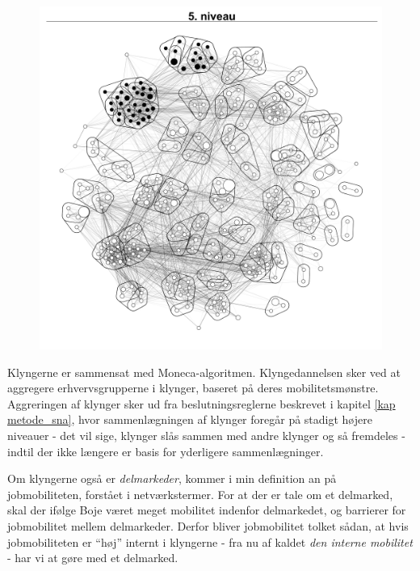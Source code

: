 
\begin{figure}[H]
\begin{centering}
  \includegraphics[width=10 cm]{fig/netvaerkskort/kort_seg_proces5.pdf}
  \caption{}
  \label{fig_seg_proces5}
\end{centering}
\end{figure}

Klyngerne er sammensat med Moneca-algoritmen. Klyngedannelsen sker ved at aggregere erhvervsgrupperne i klynger, baseret på deres mobilitetsmønstre. Aggreringen af klynger sker ud fra beslutningsreglerne beskrevet i kapitel \ref{kap metode_sna}, hvor sammenlægningen af klynger foregår på stadigt højere niveauer - det vil sige, klynger slås sammen med andre klynger og så fremdeles - indtil der ikke længere er basis for yderligere sammenlægninger. 


Om klyngerne også er \emph{delmarkeder}, kommer i min definition an på jobmobiliteten, forstået i netværkstermer. For at der er tale om et delmarked, skal der ifølge Boje været meget mobilitet indenfor delmarkedet, og barrierer for jobmobilitet mellem  delmarkeder. Derfor bliver jobmobilitet tolket sådan, at hvis jobmobiliteten er “høj” internt i klyngerne - fra nu af kaldet \emph{den interne mobilitet} - har vi at gøre med et delmarked. 

